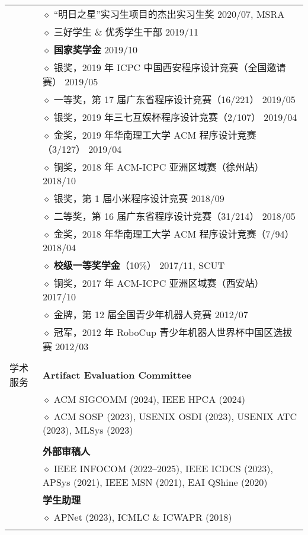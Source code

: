 \documentclass[letterpaper, 10pt]{article}
\begin{document}
\begin{longtable}{p{0.7in}p{6.0in}}
& $\diamond$ “明日之星”实习生项目的杰出实习生奖 \hfill 2020/07, MSRA \\

& $\diamond$ 三好学生 \& 优秀学生干部 \hfill 2019/11 \\

& $\diamond$ \textbf{国家奖学金} \hfill 2019/10 \\

& $\diamond$ 银奖，2019 年 ICPC 中国西安程序设计竞赛（全国邀请赛） \hfill 2019/05 \\

& $\diamond$ 一等奖，第 17 届广东省程序设计竞赛（16/221） \hfill 2019/05 \\

& $\diamond$ 银奖，2019 年三七互娱杯程序设计竞赛（2/107） \hfill 2019/04 \\

& $\diamond$ 金奖，2019 年华南理工大学 ACM 程序设计竞赛（3/127） \hfill 2019/04 \\

& $\diamond$ 铜奖，2018 年 ACM-ICPC 亚洲区域赛（徐州站） \hfill 2018/10 \\

& $\diamond$ 银奖，第 1 届小米程序设计竞赛 \hfill 2018/09 \\

& $\diamond$ 二等奖，第 16 届广东省程序设计竞赛（31/214） \hfill 2018/05 \\

& $\diamond$ 金奖，2018 年华南理工大学 ACM 程序设计竞赛（7/94） \hfill 2018/04 \\

& $\diamond$ \textbf{校级一等奖学金}（10\%） \hfill 2017/11, SCUT \\

& $\diamond$ 铜奖，2017 年 ACM-ICPC 亚洲区域赛（西安站） \hfill 2017/10 \\

& $\diamond$ 金牌，第 12 届全国青少年机器人竞赛 \hfill 2012/07\\

& $\diamond$ 冠军，2012 年 RoboCup 青少年机器人世界杯中国区选拔赛 \hfill 2012/03 \\

& \\

{学术服务}
& \textbf{Artifact Evaluation Committee} \\
& $\diamond$ ACM SIGCOMM (2024), IEEE HPCA (2024)\\
& $\diamond$ ACM SOSP (2023), USENIX OSDI (2023), USENIX ATC (2023), MLSys (2023)\\
& \\
& \textbf{外部审稿人} \\
& $\diamond$ IEEE INFOCOM (2022--2025), IEEE ICDCS (2023), APSys (2021), IEEE MSN (2021), EAI QShine (2020) \\
& \textbf{学生助理} \\
& $\diamond$ APNet (2023), ICMLC \& ICWAPR (2018) \\
& \\


\end{longtable}
\end{document}
